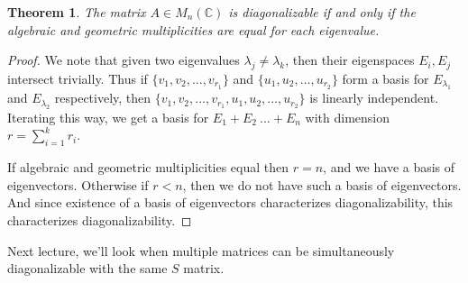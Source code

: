 \documentclass[11pt]{article}
\theoremstyle{plain} %
\newtheorem{theorem}{Theorem}[section]
\theoremstyle{definition} %
\theoremstyle{remark} %
\begin{document}
\begin{theorem}
The matrix $A \in M_n(\mathbb{C})$ is diagonalizable if and only if
the algebraic and geometric multiplicities are equal for each eigenvalue.
\end{theorem}
\begin{proof}
We note that given two eigenvalues $\lambda_j \neq \lambda_k$, then
their eigenspaces $E_{i}, E_{j}$ intersect trivially. Thus if $\{ v_1
, v_2 , \ldots , v_{r_1} \}$ and $\{ u_1 , u_2 , \ldots , u_{r_2} \}$
form a basis for $E_{\lambda_1}$ and $E_{\lambda_2}$ respectively,
then $\{ v_1 , v_2 , \ldots , v_{r_1}, u_1 , u_2 , \ldots , u_{r_2}
\}$ is linearly independent. Iterating this way, we get a basis for
$E_1 + E_2 \ \ldots  + E_n$ with dimension $r = \sum_{i = 1}^{k} r_i$.

If algebraic and geometric multiplicities equal then $r = n$, and we
have a basis of eigenvectors. Otherwise if $r < n$, then we do not
have such a basis of eigenvectors. And since existence of a basis of
eigenvectors characterizes diagonalizability, this characterizes
diagonalizability.
\end{proof}

Next lecture, we'll look when multiple matrices can be simultaneously
diagonalizable with the same $S$ matrix.

\printbibliography[heading=bibintoc]
\end{document}
